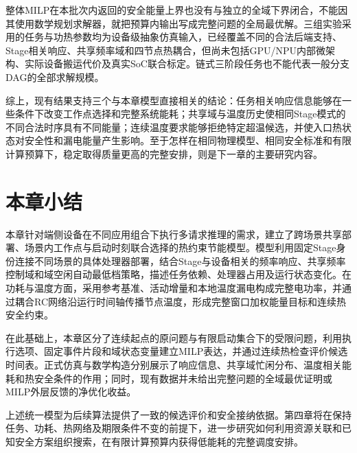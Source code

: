 整体MILP在本批次内返回的安全能量上界也没有与独立的全域下界闭合，不能因其使用数学规划求解器，就把预算内输出写成完整问题的全局最优解。三组实验采用的任务与功热参数均为设备级抽象仿真输入，已经覆盖不同的合法后端支持、Stage相关响应、共享频率域和四节点热耦合，但尚未包括GPU/NPU内部微架构、实际设备搬运代价及真实SoC联合标定。链式三阶段任务也不能代表一般分支DAG的全部求解规模。

综上，现有结果支持三个与本章模型直接相关的结论：任务相关响应信息能够在一些条件下改变工作点选择和完整系统能耗；共享域与温度历史使相同Stage模式的不同合法时序具有不同能量；连续温度要求能够拒绝特定超温候选，并使入口热状态对安全性和漏电能量产生影响。至于怎样在相同物理模型、相同安全标准和有限计算预算下，稳定取得质量更高的完整安排，则是下一章的主要研究内容。

\section{本章小结}

本章针对端侧设备在不同应用组合下执行多请求推理的需求，建立了跨场景共享部署、场景内工作点与启动时刻联合选择的热约束节能模型。模型利用固定Stage身份连接不同场景的具体处理器部署，结合Stage与设备相关的频率响应、共享频率控制域和域空闲自动最低档策略，描述任务依赖、处理器占用及运行状态变化。在功耗与温度方面，采用参考基准、活动增量和本地温度漏电构成完整电功率，并通过耦合RC网络沿运行时间轴传播节点温度，形成完整窗口加权能量目标和连续热安全约束。

在此基础上，本章区分了连续起点的原问题与有限启动集合下的受限问题，利用执行选项、固定事件片段和域状态变量建立MILP表达，并通过连续热检查评价候选时间表。正式仿真与数学构造分别展示了响应信息、共享域忙闲分布、温度相关能耗和热安全条件的作用；同时，现有数据并未给出完整问题的全域最优证明或MILP外层反馈的净优化收益。

上述统一模型为后续算法提供了一致的候选评价和安全接纳依据。第四章将在保持任务、功耗、热网络及期限条件不变的前提下，进一步研究如何利用资源关联和已知安全方案组织搜索，在有限计算预算内获得低能耗的完整调度安排。
